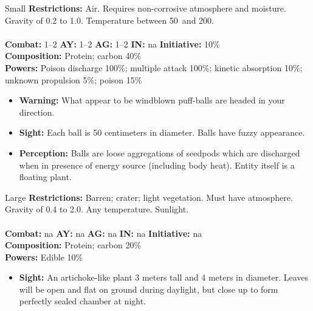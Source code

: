 \hrulefill

\begin{creature}{Small}
\textbf{Restrictions:} Air. Requires non-corrosive atmosphere and moisture. Gravity of 0.2 to 1.0. Temperature between 50\textdegree\ and 200\textdegree. \\\\
\textbf{Combat:} 1--2 \textbf{AY:} 1--2 \textbf{AG:} 1--2 \textbf{IN:} na \textbf{Initiative:} 10\% \\
\textbf{Composition:} Protein; carbon 40\% \\
\textbf{Powers:} Poison discharge 100\%; multiple attack 100\%; kinetic absorption 10\%; unknown propulsion 5\%; poison 15\% 
\begin{itemize}
\item \textbf{Warning:} What appear to be windblown puff-balls are headed in your direction. 
\item \textbf{Sight:} Each ball is 50 centimeters in diameter. Balls have fuzzy appearance. 
\item \textbf{Perception:} Balls are loose aggregations of seedpods which are discharged when in presence of energy source (including body 
heat). Entity itself is a floating plant. 
\end{itemize}
\end{creature}

\hrulefill

\begin{creature}{Large}
\textbf{Restrictions:} Barren; crater; light vegetation. Must have atmosphere. Gravity of 0.4 to 2.0. Any temperature. Sunlight. \\\\
\textbf{Combat:} na \textbf{AY:} na \textbf{AG:} na \textbf{IN:} na \textbf{Initiative:} na \\
\textbf{Composition:} Protein; carbon 20\% \\
\textbf{Powers:} Edible 10\% 
\begin{itemize}
\item \textbf{Sight:} An artichoke-like plant 3 meters tall and 4 meters in diameter. Leaves will be open and flat on ground during daylight, but close 
up to form perfectly sealed chamber at night. 
\end{itemize}
\end{creature}

\hrulefill

